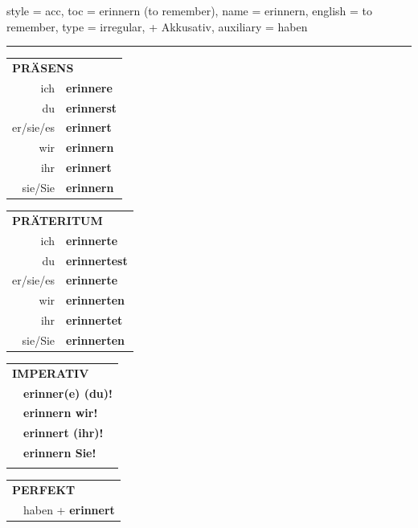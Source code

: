 \begin{verbentry}{
  style = {acc},
  toc = {erinnern (to remember)},
  name = {erinnern},
  english = {to remember},
  type = {irregular, + Akkusativ},
  auxiliary = {haben}
}
 
    
     \vspace{5pt}

    \hrule
    
    \vspace{5pt}

  \begin{tabular}{rl}
     \multicolumn{2}{l}{\textbf{PRÄSENS} }\\
    ich & \textbf{erinnere}\\
    du & \textbf{erinnerst}\\
    er/sie/es & \textbf{erinnert}\\
    wir & \textbf{erinnern}\\
    ihr & \textbf{erinnert}\\
    sie/Sie & \textbf{erinnern}\\
  \end{tabular}
  \hfill
     \begin{tabular}{rl}
    \multicolumn{2}{l}{\textbf{PRÄTERITUM} }\\
    ich & \textbf{erinnerte}\\
    du & \textbf{erinnertest}\\
    er/sie/es & \textbf{erinnerte}\\
    wir & \textbf{erinnerten}\\
    ihr & \textbf{erinnertet}\\
    sie/Sie & \textbf{erinnerten}\\
  \end{tabular}
  \hfill
  \begin{tabular}{rl}
     \multicolumn{2}{l}{\textbf{IMPERATIV} }\\
   & \textbf{erinner(e) (du)!}\\
   & \textbf{erinnern wir!}\\
   & \textbf{erinnert (ihr)!}\\
   & \textbf{erinnern Sie!}\\
   & \vspace{10pt}
  \end{tabular}

    \vspace{10pt}

 \begin{tabular}{rl}
     \multicolumn{2}{l}{\textbf{PERFEKT}}\\
   & haben + \textbf{erinnert}\\
  \end{tabular}
\hfill
   \begin{tabular}{rl}
   

\end{tabular}
\end{verbentry}
